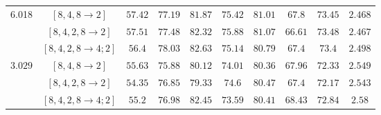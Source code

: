 \begin{table*}[t!]
{\begin{tabular}{@{}cccccccccc@{}}
                       \multirow{3}{*}{6.018} & $[8,4,8 \rightarrow2]$       & $57.42$ & $77.19$ & $81.87$ & $75.42$   & $81.01$ & $67.8$     & $73.45$ & $2.468$              \\
                       & $[8,4,2,8 \rightarrow2]$    & $57.51$ & $77.48$ & $82.32$ & $75.88$   & $81.07$ & $66.61$    & $73.48$ & $2.467$              \\
                       & $[8,4,2,8 \rightarrow4;2]$ & $56.4$  & $78.03$ & $82.63$ & $75.14$   & $80.79$ & $67.4$     & $73.4$  & $2.498$              \\ 
 \midrule
 \multirow{3}{*}{$3.029$} & $[8,4,8 \rightarrow2]$       & $55.63$ & $75.88$ & $80.12$ & $74.01$   & $80.36$ & $67.96$    & $72.33$ & $2.549$              \\
                       & $[8,4,2,8 \rightarrow2]$    & $54.35$ & $76.85$ & $79.33$ & $74.6$    & $80.47$ & $67.4$     & $72.17$ & $2.543$              \\
                       & $[8,4,2,8 \rightarrow4;2]$ & $55.2$  & $76.98$ & $82.45$ & $73.59$   & $80.41$ & $68.43$    & $72.84$ & $2.58$               \\
\bottomrule
\end{tabular}
}
\end{table*}



